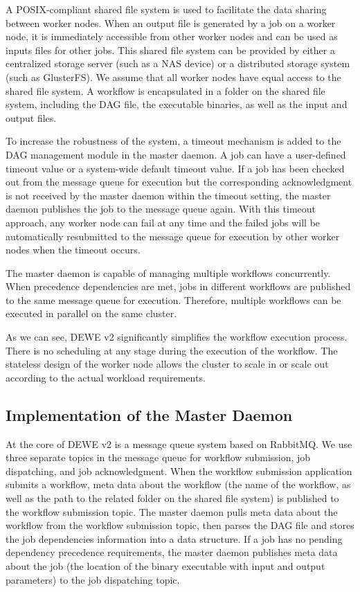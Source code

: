 A POSIX-compliant shared file system is used to facilitate the data sharing between worker nodes. When an output file is generated by a job on a worker node, it is immediately accessible from other worker nodes and can be used as inputs files for other jobs. This shared file system can be provided by either a centralized storage server (such as a NAS device) or a distributed storage system (such as GlusterFS). We assume that all worker nodes have equal access to the shared file system. A workflow is encapsulated in a folder on the shared file system, including the DAG file, the executable binaries, as well as the input and output files. 

To increase the robustness of the system, a timeout mechanism is added to the DAG management module in the master daemon. A job can have a user-defined timeout value or a system-wide default timeout value. If a job has been checked out from the message queue for execution but the corresponding acknowledgment is not received by the master daemon within the timeout setting, the master daemon publishes the job to the message queue again. With this timeout approach, any worker node can fail at any time and the failed jobs will be automatically resubmitted to the message queue for execution by other worker nodes when the timeout occurs.

The master daemon is capable of managing multiple workflows concurrently. When precedence dependencies are met, jobs in different workflows are published to the same message queue for execution. Therefore, multiple workflows can be executed in parallel on the same cluster. 

As we can see, DEWE v2 significantly simplifies the workflow execution process. There is no scheduling at any stage during the execution of the workflow. The stateless design of the worker node allows the cluster to scale in or scale out according to the actual workload requirements. 



\subsection{Implementation of the Master Daemon}
\label{sec:subsec:master_daemon}

At the core of DEWE v2 is a message queue system based on RabbitMQ. We use three separate topics in the message queue for workflow submission, job dispatching, and job acknowledgment. When the workflow submission application submits a workflow, meta data about the workflow (the name of the workflow, as well as the path to the related folder on the shared file system) is published to the workflow submission topic. The master daemon pulls meta data about the workflow from the workflow submission topic, then parses the DAG file and stores the job dependencies information into a data structure. If a job has no pending dependency precedence requirements, the master daemon publishes meta data about the job (the location of the binary executable with input and output parameters) to the job dispatching topic.

